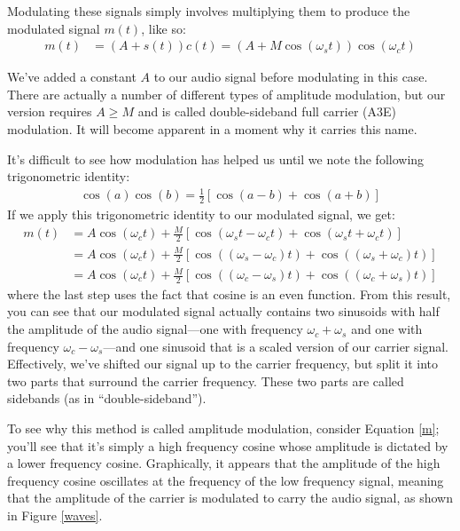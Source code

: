 \documentclass{article}
\begin{document}
Modulating these signals simply involves multiplying them to produce the modulated signal $m(t)$, like so:
\begin{align}
  m(t) &= (A + s(t))c(t) = (A + M\cos\left(\omega_s t\right)) \cos\left(\omega_c t\right)
\label{m}
\end{align}

We've added a constant $A$ to our audio signal before modulating in this case. There are actually a number of different types of amplitude modulation, but our version requires $A \geq M$ and is called double-sideband full carrier (A3E) modulation. It will become apparent in a moment why it carries this name.

It's difficult to see how modulation has helped us until we note the following trigonometric identity:
\begin{align}
  \cos(a)\cos(b) = \frac{1}{2}\left[\cos(a-b) + \cos(a+b)\right]
\label{trig}
\end{align}
If we apply this trigonometric identity to our modulated signal, we get:
\begin{align*}
  m(t) &= A\cos(\omega_c t) + \frac{M}{2}\left[\cos(\omega_s t - \omega_c t) + \cos(\omega_s t + \omega_c t)\right] \\
    &= A\cos(\omega_c t) + \frac{M}{2}\left[\cos\left((\omega_s - \omega_c) t\right) + \cos\left((\omega_s + \omega_c) t\right)\right] \\
    &= A\cos(\omega_c t) + \frac{M}{2}\left[\cos\left((\omega_c - \omega_s) t\right) + \cos\left((\omega_c + \omega_s) t\right)\right]
\end{align*}
where the last step uses the fact that cosine is an even function. From this result, you can see that our modulated signal actually contains two sinusoids with half the amplitude of the audio signal---one with frequency $\omega_c + \omega_s$ and one with frequency $\omega_c - \omega_s$---and one sinusoid that is a scaled version of our carrier signal. Effectively, we've shifted our signal up to the carrier frequency, but split it into two parts that surround the carrier frequency. These two parts are called sidebands (as in ``double-sideband'').

To see why this method is called amplitude modulation, consider Equation \ref{m}; you'll see that it's simply a high frequency cosine whose amplitude is dictated by a lower frequency cosine. Graphically, it appears that the amplitude of the high frequency cosine oscillates at the frequency of the low frequency signal, meaning that the amplitude of the carrier is modulated to carry the audio signal, as shown in Figure \ref{waves}.
\end{document}
